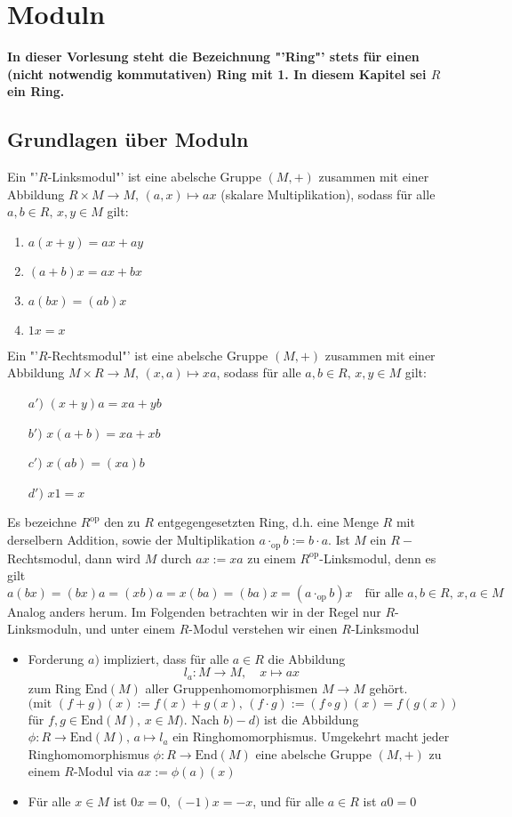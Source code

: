 \newpage
\section{Moduln}
\begin{center}
	\textbf{In dieser Vorlesung steht die Bezeichnung "'Ring"' stets für einen (nicht notwendig kommutativen) Ring mit 1. In diesem Kapitel sei $R$ ein Ring.}
\end{center}
\subsection{Grundlagen über Moduln}
\begin{df}
	Ein "'$R$-Linksmodul"' ist eine abelsche Gruppe $(M, +)$ zusammen mit einer Abbildung $R\times M \to M, \, (a,x) \mapsto ax$ (skalare Multiplikation), sodass für alle $a,b\in R, \, x,y\in M$ gilt:
	\begin{enumerate}[label= \alph*)]
		\item $a(x+y) = ax + ay$
		\item $(a+b)x = ax+bx$
		\item $a(bx) = (ab)x$
		\item $1x = x$
	\end{enumerate}
Ein "'$R$-Rechtsmodul"' ist eine abelsche Gruppe $(M, +)$ zusammen mit einer Abbildung $M\times R \to M, \, (x,a) \mapsto xa$, sodass für alle $a,b\in R, \, x,y\in M$ gilt:
\begin{enumerate}
	\item[$a')$] $(x+y)a = xa+ yb$
	\item[$b')$] $x(a+b) = xa + xb$
	\item[$c')$] $x(ab) = (xa)b$
	\item[$d')$] $x1=x$
\end{enumerate}
\end{df}
\begin{anm}
	Es bezeichne $R^\text{op}$ den zu $R$ entgegengesetzten Ring, d.h. eine Menge $R$ mit derselbern Addition, sowie der Multiplikation $a \cdot_\text{op}b := b \cdot a$. Ist $M$ ein $R-$Rechtsmodul, dann wird $M$ durch $ax:= xa$ zu einem $R^\text{op}$-Linksmodul, denn es gilt 
	$$a(bx) = (bx)a = (xb)a = x(ba) = (ba)x = (a \cdot_\text{op} b)x \quad \text{für alle } a,b\in R, \, x,a\in M$$
	Analog anders herum. Im Folgenden betrachten wir in der Regel nur $R$-Linksmoduln, und unter einem $R$-Modul verstehen wir einen $R$-Linksmodul
	\begin{itemize}
		\item Forderung $a)$ impliziert, dass für alle $a\in R$ die Abbildung 
		$$l_a: M \to M, \quad x\mapsto ax$$
		zum Ring $\text{End}(M)$ aller Gruppenhomomorphismen $M\to M$ gehört.
		$$(\text{mit } (f+g)(x) := f(x) + g(x), \, (f\cdot g) := (f\circ g)(x) = f(g(x))$$für $f,g\in \text{End}(M), \, x\in M)$. Nach $b)-d)$ ist die Abbildung $\phi:R\to \text{End}(M), \, a\mapsto l_a$ ein Ringhomomorphismus. Umgekehrt macht jeder Ringhomomorphismus $\phi:R\to \text{End}(M)$ eine abelsche Gruppe $(M,+)$ zu einem $R$-Modul via $ax:= \phi(a)(x)$
		\item Für alle $x\in M$ ist $0x=0, \, (-1)x=-x$, und für alle $a\in R$ ist $a0=0$ 
	\end{itemize}
\end{anm}
